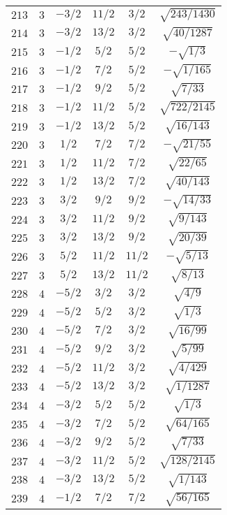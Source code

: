 \begin{table}
\begin{center}
\begin{tabular}{|c|c|c|c|c|c|}
$213$ & $3$ & $-3/2$ & $11/2$ & $3/2$ & $\sqrt{243/1430}$ \\ 
$214$ & $3$ & $-3/2$ & $13/2$ & $3/2$ & $\sqrt{40/1287}$ \\ 
$215$ & $3$ & $-1/2$ & $5/2$ & $5/2$ & $-\sqrt{1/3}$ \\ 
$216$ & $3$ & $-1/2$ & $7/2$ & $5/2$ & $-\sqrt{1/165}$ \\ 
$217$ & $3$ & $-1/2$ & $9/2$ & $5/2$ & $\sqrt{7/33}$ \\ 
$218$ & $3$ & $-1/2$ & $11/2$ & $5/2$ & $\sqrt{722/2145}$ \\ 
$219$ & $3$ & $-1/2$ & $13/2$ & $5/2$ & $\sqrt{16/143}$ \\ 
$220$ & $3$ & $1/2$ & $7/2$ & $7/2$ & $-\sqrt{21/55}$ \\ 
$221$ & $3$ & $1/2$ & $11/2$ & $7/2$ & $\sqrt{22/65}$ \\ 
$222$ & $3$ & $1/2$ & $13/2$ & $7/2$ & $\sqrt{40/143}$ \\ 
$223$ & $3$ & $3/2$ & $9/2$ & $9/2$ & $-\sqrt{14/33}$ \\ 
$224$ & $3$ & $3/2$ & $11/2$ & $9/2$ & $\sqrt{9/143}$ \\ 
$225$ & $3$ & $3/2$ & $13/2$ & $9/2$ & $\sqrt{20/39}$ \\ 
$226$ & $3$ & $5/2$ & $11/2$ & $11/2$ & $-\sqrt{5/13}$ \\ 
$227$ & $3$ & $5/2$ & $13/2$ & $11/2$ & $\sqrt{8/13}$ \\ 
$228$ & $4$ & $-5/2$ & $3/2$ & $3/2$ & $\sqrt{4/9}$ \\ 
$229$ & $4$ & $-5/2$ & $5/2$ & $3/2$ & $\sqrt{1/3}$ \\ 
$230$ & $4$ & $-5/2$ & $7/2$ & $3/2$ & $\sqrt{16/99}$ \\ 
$231$ & $4$ & $-5/2$ & $9/2$ & $3/2$ & $\sqrt{5/99}$ \\ 
$232$ & $4$ & $-5/2$ & $11/2$ & $3/2$ & $\sqrt{4/429}$ \\ 
$233$ & $4$ & $-5/2$ & $13/2$ & $3/2$ & $\sqrt{1/1287}$ \\ 
$234$ & $4$ & $-3/2$ & $5/2$ & $5/2$ & $\sqrt{1/3}$ \\ 
$235$ & $4$ & $-3/2$ & $7/2$ & $5/2$ & $\sqrt{64/165}$ \\ 
$236$ & $4$ & $-3/2$ & $9/2$ & $5/2$ & $\sqrt{7/33}$ \\ 
$237$ & $4$ & $-3/2$ & $11/2$ & $5/2$ & $\sqrt{128/2145}$ \\ 
$238$ & $4$ & $-3/2$ & $13/2$ & $5/2$ & $\sqrt{1/143}$ \\ 
$239$ & $4$ & $-1/2$ & $7/2$ & $7/2$ & $\sqrt{56/165}$ \\ 

\end{tabular}
\end{center}
\end{table}
